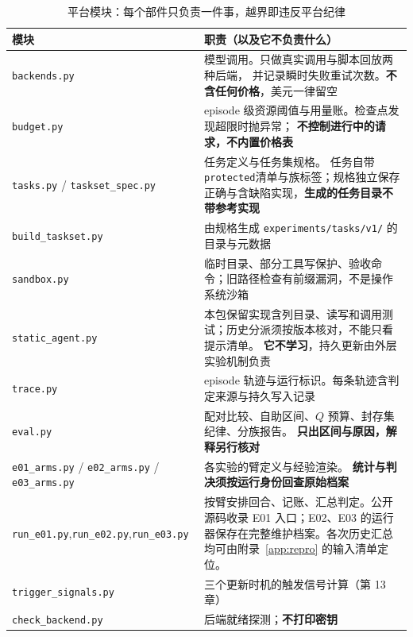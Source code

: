 \begin{table}[htbp]
\centering
\caption{平台模块：每个部件只负责一件事，越界即违反平台纪律}
\label{tab:appb-modules}
\begin{tabular}{>{\raggedright\arraybackslash}p{3.9cm}>{\raggedright\arraybackslash}p{9.0cm}}
\toprule
模块 & 职责（以及它不负责什么） \\
\midrule
\texttt{backends.py} & 模型调用。只做真实调用与脚本回放两种后端，
        并记录瞬时失败重试次数。\textbf{不含任何价格}，美元一律留空 \\
\texttt{budget.py} & episode 级资源阈值与用量账。检查点发现超限时抛异常；
        \textbf{不控制进行中的请求，不内置价格表} \\
\texttt{tasks.py} / \texttt{taskset\_spec.py} & 任务定义与任务集规格。
        任务自带\texttt{protected}清单与族标签；规格独立保存正确与含缺陷实现，\textbf{生成的任务目录不带参考实现} \\
\texttt{build\_taskset.py} & 由规格生成 \texttt{experiments/tasks/v1/} 的目录与元数据 \\
\texttt{sandbox.py} & 临时目录、部分工具写保护、验收命令；旧路径检查有前缀漏洞，不是操作系统沙箱 \\
\texttt{static\_agent.py} & 本包保留实现含列目录、读写和调用测试；历史分派须按版本核对，不能只看提示清单。
        \textbf{它不学习}，持久更新由外层实验机制负责 \\
\texttt{trace.py} & episode 轨迹与运行标识。每条轨迹含判定来源与持久写入记录 \\
\texttt{eval.py} & 配对比较、自助区间、$Q$ 预算、封存集纪律、分族报告。
        \textbf{只出区间与原因，解释另行核对} \\
\texttt{e01\_arms.py} / \texttt{e02\_arms.py} / \texttt{e03\_arms.py} & 各实验的臂定义与经验渲染。
        \textbf{统计与判决须按运行身份回查原始档案} \\
\texttt{run\_e01.py},\newline\texttt{run\_e02.py},\newline\texttt{run\_e03.py} & 按臂安排回合、记账、汇总判定。公开源码收录 E01 入口；E02、E03 的运行器保存在完整维护档案。各次历史汇总均可由附录~\ref{app:repro} 的输入清单定位。 \\
\texttt{trigger\_signals.py} & 三个更新时机的触发信号计算（第 13 章） \\
\texttt{check\_backend.py} & 后端就绪探测；\textbf{不打印密钥} \\
\bottomrule
\end{tabular}
\end{table}

